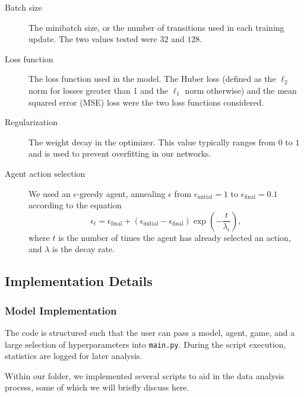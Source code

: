 \documentclass[11pt]{article}
\begin{document}
\begin{description}
    \item[Batch size] The minibatch size, or the number of transitions used in each training update. The two values tested were $32$ and $128$.
    
    \item[Loss function] The loss function used in the model. The Huber loss (defined as the $\ell_2$ norm for losses greater than 1 and the $\ell_1$ norm otherwise) and the mean squared error (MSE) loss were the two loss functions considered.
    
    \item[Regularization] The weight decay in the optimizer. This value typically ranges from $0$ to $1$ and is used to prevent overfitting in our networks.
    
    \item[Agent action selection] We used an $\epsilon$-greedy agent, annealing $\epsilon$ from $\epsilon_\text{initial} = 1$ to $\epsilon_\text{final} = 0.1$ according to the equation $$\epsilon_t = \epsilon_\text{final} + (\epsilon_\text{initial} - \epsilon_\text{final}) \exp\left(-\frac{t}{\lambda_\epsilon}\right),$$ where $t$ is the number of times the agent has already selected an action, and $\lambda$ is the decay rate. 
\end{description}


\subsection{Implementation Details}

\subsubsection{Model Implementation}

The code is structured such that the user can pass a model, agent, game, and a large selection of hyperparameters into \texttt{main.py}. During the script execution, statistics are logged for later analysis. 

Within our  folder, we implemented several scripts to aid in the data analysis process, some of which we will briefly discuss here. 
\end{document}
